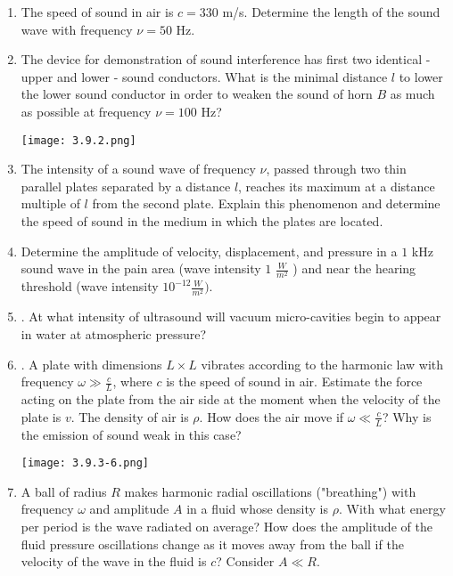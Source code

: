 \documentclass{article}
\begin{document}
\begin{enumerate}[label=3.9.\arabic*]

\item The speed of sound in air is $c = 330$ m/s. Determine the length of the sound wave with frequency $\nu = 50$ Hz.

\item The device for demonstration of sound interference has first two identical - upper and lower - sound conductors. What is the minimal distance $l$ to lower the lower sound conductor in order to weaken the sound of horn $B$ as much as possible at frequency $\nu = 100$ Hz?

\begin{center}
    \texttt{[image: 3.9.2.png]}
\end{center}

\item The intensity of a sound wave of frequency $\nu$, passed through two thin parallel plates separated by a distance $l$, reaches its maximum at a distance multiple of $l$ from the second plate. Explain this phenomenon and determine the speed of sound in the medium in which the plates are located.

\item Determine the amplitude of velocity, displacement, and pressure in a $1$ kHz sound wave in the pain area (wave intensity $1$ $\frac{W}{m^2}$ ) and near the hearing threshold (wave intensity $10^{-12} \frac{W}{m^2})$.

\item . At what intensity of ultrasound will vacuum micro-cavities begin to appear in water at atmospheric pressure?

\item . A plate with dimensions $L \times L$ vibrates according to the harmonic law with frequency $\omega \gg \frac{c}{L}$, where $c$ is the speed of sound in air. Estimate the force acting on the plate from the air side at the moment when the velocity of the plate is $v$. The density of air is $\rho$. How does the air move if $\omega \ll \frac{c}{L}$? Why is the emission of sound weak in this case?

\begin{center}
    \texttt{[image: 3.9.3-6.png]}
\end{center}

\item A ball of radius $R$ makes harmonic radial oscillations ("breathing") with frequency $\omega$ and amplitude $A$ in a fluid whose density is $\rho$. With what energy per period is the wave radiated on average? How does the amplitude of the fluid pressure oscillations change as it moves away from the ball if the velocity of the wave in the fluid is $c$? Consider $A \ll R$.


\end{enumerate}
\end{document}
